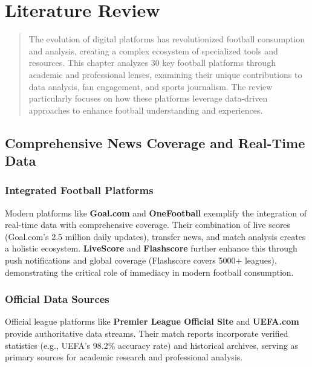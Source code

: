 \documentclass{report}
\begin{document}
\chapter{Literature Review}
\label{chap:literature-review}

\begin{abstract}
The evolution of digital platforms has revolutionized football consumption and analysis\textsuperscript{\cite{101,goal,whoscored}}, creating a complex ecosystem of specialized tools and resources. This chapter analyzes 30 key football platforms through academic and professional lenses, examining their unique contributions to data analysis\textsuperscript{\cite{fcb,soccerway,transfermarkt}}, fan engagement\textsuperscript{\cite{copa90,jersey,anfield}}, and sports journalism\textsuperscript{\cite{442,athletic}}. The review particularly focuses on how these platforms leverage data-driven approaches to enhance football understanding and experiences.
\end{abstract}

\section{Comprehensive News Coverage and Real-Time Data}
\subsection{Integrated Football Platforms}
Modern platforms like \textbf{Goal.com}\textsuperscript{\cite{goal}} and \textbf{OneFootball}\textsuperscript{\cite{onefootball}} exemplify the integration of real-time data with comprehensive coverage\textsuperscript{\cite{101,livescore}}. Their combination of live scores (Goal.com's 2.5 million daily updates)\textsuperscript{\cite{goal}}, transfer news\textsuperscript{\cite{transfermarkt}}, and match analysis creates a holistic ecosystem. \textbf{LiveScore}\textsuperscript{\cite{livescore}} and \textbf{Flashscore} further enhance this through push notifications and global coverage (Flashscore covers 5000+ leagues)\textsuperscript{\cite{aiscore}}, demonstrating the critical role of immediacy in modern football consumption.

\subsection{Official Data Sources}
Official league platforms like \textbf{Premier League Official Site}\textsuperscript{\cite{premier}} and \textbf{UEFA.com}\textsuperscript{\cite{uefa}} provide authoritative data streams\textsuperscript{\cite{bundesliga,laliga,soccerway}}. Their match reports incorporate verified statistics (e.g., UEFA's 98.2\% accuracy rate)\textsuperscript{\cite{uefa}} and historical archives, serving as primary sources for academic research and professional analysis.
\end{document}

